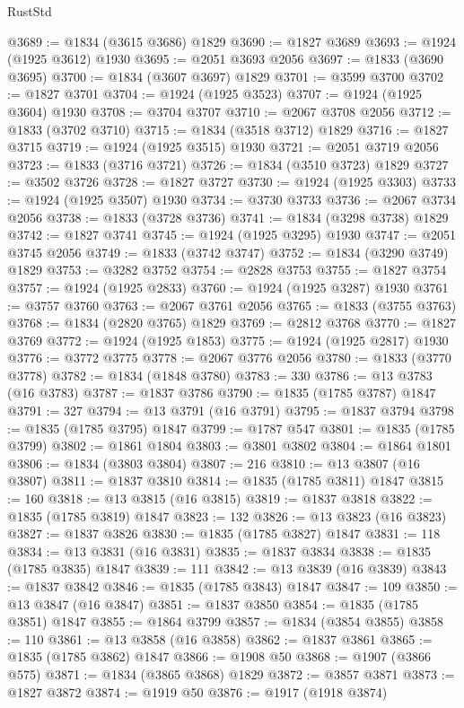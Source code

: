 \begin{lexlean}{RustStd}
\begin{coremodule}
@3689 := @1834 (@3615 @3686) @1829
@3690 := @1827 @3689
@3693 := @1924 (@1925 @3612) @1930
@3695 := @2051 @3693 @2056
@3697 := @1833 (@3690 @3695)
@3700 := @1834 (@3607 @3697) @1829
@3701 := @3599 @3700
@3702 := @1827 @3701
@3704 := @1924 (@1925 @3523)
@3707 := @1924 (@1925 @3604) @1930
@3708 := @3704 @3707
@3710 := @2067 @3708 @2056
@3712 := @1833 (@3702 @3710)
@3715 := @1834 (@3518 @3712) @1829
@3716 := @1827 @3715
@3719 := @1924 (@1925 @3515) @1930
@3721 := @2051 @3719 @2056
@3723 := @1833 (@3716 @3721)
@3726 := @1834 (@3510 @3723) @1829
@3727 := @3502 @3726
@3728 := @1827 @3727
@3730 := @1924 (@1925 @3303)
@3733 := @1924 (@1925 @3507) @1930
@3734 := @3730 @3733
@3736 := @2067 @3734 @2056
@3738 := @1833 (@3728 @3736)
@3741 := @1834 (@3298 @3738) @1829
@3742 := @1827 @3741
@3745 := @1924 (@1925 @3295) @1930
@3747 := @2051 @3745 @2056
@3749 := @1833 (@3742 @3747)
@3752 := @1834 (@3290 @3749) @1829
@3753 := @3282 @3752
@3754 := @2828 @3753
@3755 := @1827 @3754
@3757 := @1924 (@1925 @2833)
@3760 := @1924 (@1925 @3287) @1930
@3761 := @3757 @3760
@3763 := @2067 @3761 @2056
@3765 := @1833 (@3755 @3763)
@3768 := @1834 (@2820 @3765) @1829
@3769 := @2812 @3768
@3770 := @1827 @3769
@3772 := @1924 (@1925 @1853)
@3775 := @1924 (@1925 @2817) @1930
@3776 := @3772 @3775
@3778 := @2067 @3776 @2056
@3780 := @1833 (@3770 @3778)
@3782 := @1834 (@1848 @3780)
@3783 := 330
@3786 := @13 @3783 (@16 @3783)
@3787 := @1837 @3786
@3790 := @1835 (@1785 @3787) @1847
@3791 := 327
@3794 := @13 @3791 (@16 @3791)
@3795 := @1837 @3794
@3798 := @1835 (@1785 @3795) @1847
@3799 := @1787 @547
@3801 := @1835 (@1785 @3799)
@3802 := @1861 @1804
@3803 := @3801 @3802
@3804 := @1864 @1801
@3806 := @1834 (@3803 @3804)
@3807 := 216
@3810 := @13 @3807 (@16 @3807)
@3811 := @1837 @3810
@3814 := @1835 (@1785 @3811) @1847
@3815 := 160
@3818 := @13 @3815 (@16 @3815)
@3819 := @1837 @3818
@3822 := @1835 (@1785 @3819) @1847
@3823 := 132
@3826 := @13 @3823 (@16 @3823)
@3827 := @1837 @3826
@3830 := @1835 (@1785 @3827) @1847
@3831 := 118
@3834 := @13 @3831 (@16 @3831)
@3835 := @1837 @3834
@3838 := @1835 (@1785 @3835) @1847
@3839 := 111
@3842 := @13 @3839 (@16 @3839)
@3843 := @1837 @3842
@3846 := @1835 (@1785 @3843) @1847
@3847 := 109
@3850 := @13 @3847 (@16 @3847)
@3851 := @1837 @3850
@3854 := @1835 (@1785 @3851) @1847
@3855 := @1864 @3799
@3857 := @1834 (@3854 @3855)
@3858 := 110
@3861 := @13 @3858 (@16 @3858)
@3862 := @1837 @3861
@3865 := @1835 (@1785 @3862) @1847
@3866 := @1908 @50
@3868 := @1907 (@3866 @575)
@3871 := @1834 (@3865 @3868) @1829
@3872 := @3857 @3871
@3873 := @1827 @3872
@3874 := @1919 @50
@3876 := @1917 (@1918 @3874)

\end{coremodule}
\end{lexlean}
